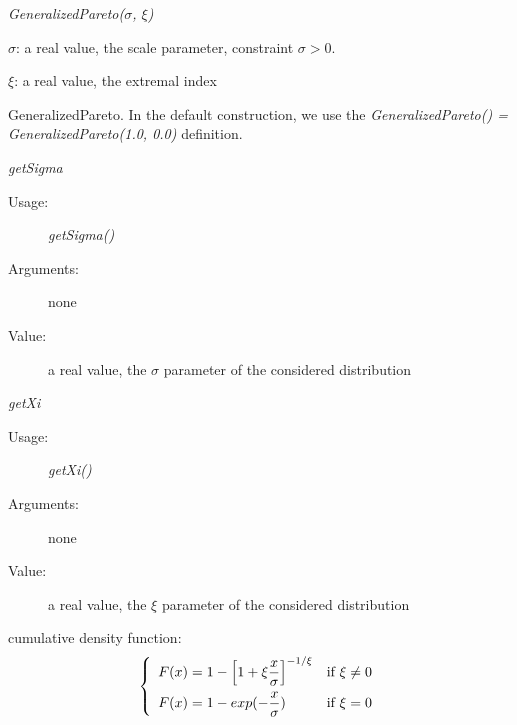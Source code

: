 \begin{description}

\item[Usage:] \textit{GeneralizedPareto($\sigma$, $\xi$)}

\item[Arguments:]  \rule{0pt}{1em}
\begin{description}
\item $\sigma$: a real value, the scale parameter, constraint  $\sigma >0$.
\item $\xi$:  a real value, the extremal index
\end{description}

\item[Value:] GeneralizedPareto. In the default construction, we use the \textit{GeneralizedPareto() = GeneralizedPareto(1.0, 0.0)} definition.

\item[Some methods:] \rule{0pt}{1em}
\begin{description}

\item \textit{getSigma}
\begin{description}
\item[Usage:] \textit{getSigma()}
\item[Arguments:] none
\item[Value:]  a real value, the  $\sigma$ parameter of the considered distribution
\end{description}
\bigskip

\item \textit{getXi}
\begin{description}
\item[Usage:] \textit{getXi()}
\item[Arguments:] none
\item[Value:]  a real value, the  $\xi$ parameter of the considered distribution
\end{description}
\bigskip
\end{description}

\item[Details:]  \rule{0pt}{1em}
\begin{description}
\item cumulative density function:
\begin{equation}
\left\{
\begin{array}{ll}
\displaystyle F(x) =  1-\left[
1+\xi\frac{x}{\sigma}\right]_{\strut}^{-1/\xi} & \mbox{if } \xi \neq 0 \\
\displaystyle F(x) =  1-exp(-\frac{x}{\sigma}) & \mbox{if } \xi = 0
\end{array}
\right.
\end{equation}
\end{description}

\item[Links:]  \rule{0pt}{1em}
\end{description}


